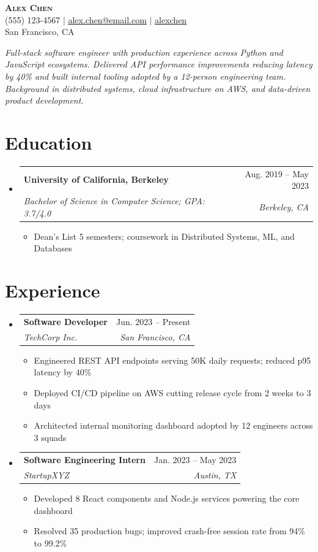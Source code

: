 \documentclass[letterpaper,11pt]{article}
\makeatletter
\newcommand{\resumeItem}[1]{
  \item\small{{#1 \vspace{-2pt}}}
}
\newcommand{\resumeSubheading}[4]{
  \vspace{-2pt}\item
    \begin{tabular*}{0.97\textwidth}[t]{l@{\extracolsep{\fill}}r}
      \textbf{#1} & #2 \\
      \textit{\small#3} & \textit{\small #4} \\
    \end{tabular*}\vspace{-7pt}
}
\newcommand{\resumeSubHeadingListStart}{\begin{itemize}[leftmargin=0.15in, label={}]}
\newcommand{\resumeSubHeadingListEnd}{\end{itemize}}
\newcommand{\resumeItemListStart}{\begin{itemize}}
\newcommand{\resumeItemListEnd}{\end{itemize}\vspace{-5pt}}
\makeatother
\begin{document}
\begin{center}
    \textbf{\Huge \scshape Alex Chen} \\ \vspace{1pt}
    \small (555) 123-4567 $|$
    \href{mailto:alex.chen@email.com}{\underline{alex.chen@email.com}} $|$
    \faLinkedin \hspace{1pt} \href{https://linkedin.com/in/alexchen}{\underline{alexchen}} \\
    \small San Francisco, CA
\end{center}
\vspace{-10pt}
\begin{center}
    \small \textit{Full-stack software engineer with production experience across Python and JavaScript ecosystems. Delivered API performance improvements reducing latency by 40\% and built internal tooling adopted by a 12-person engineering team. Background in distributed systems, cloud infrastructure on AWS, and data-driven product development.}
\end{center}

\section{Education}
\resumeSubHeadingListStart
  \resumeSubheading
    {University of California, Berkeley}{Aug. 2019 -- May 2023}
    {Bachelor of Science in Computer Science; GPA: 3.7/4.0}{Berkeley, CA}
    \resumeItemListStart
      \resumeItem{Dean's List 5 semesters; coursework in Distributed Systems, ML, and Databases}
    \resumeItemListEnd
\resumeSubHeadingListEnd

\section{Experience}
\resumeSubHeadingListStart
  \resumeSubheading
    {Software Developer}{Jun. 2023 -- Present}
    {TechCorp Inc.}{San Francisco, CA}
    \resumeItemListStart
      \resumeItem{Engineered REST API endpoints serving 50K daily requests; reduced p95 latency by 40\%}
      \resumeItem{Deployed CI/CD pipeline on AWS cutting release cycle from 2 weeks to 3 days}
      \resumeItem{Architected internal monitoring dashboard adopted by 12 engineers across 3 squads}
    \resumeItemListEnd

  \resumeSubheading
    {Software Engineering Intern}{Jan. 2023 -- May 2023}
    {StartupXYZ}{Austin, TX}
    \resumeItemListStart
      \resumeItem{Developed 8 React components and Node.js services powering the core dashboard}
      \resumeItem{Resolved 35 production bugs; improved crash-free session rate from 94\% to 99.2\%}
    \resumeItemListEnd
\resumeSubHeadingListEnd
\end{document}
